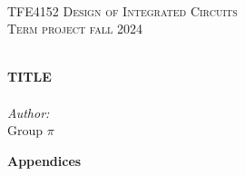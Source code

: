 \documentclass{article}
\begin{document}
\begin{titlepage}
\vbox{ }
\vbox{ }
\begin{center}
\\[1cm]
\textsc{\LARGE TFE4152 Design of Integrated Circuits}\\[1cm]
\textsc{\Large Term project fall 2024}\\[0.5cm]
\vbox{ }

\HRule \\[0.4cm]
{ \huge \bfseries TITLE}\\[0.4cm] %
\HRule \\[1.5cm]

\large
\emph{Author:}\\
Group $\pi$ %
\vfill

\end{center}
\end{titlepage}









\newpage
{}



\newpage
\vspace*{7 cm}
\begin{center}
\textbf{\Huge Appendices}
\end{center}

\end{document}
